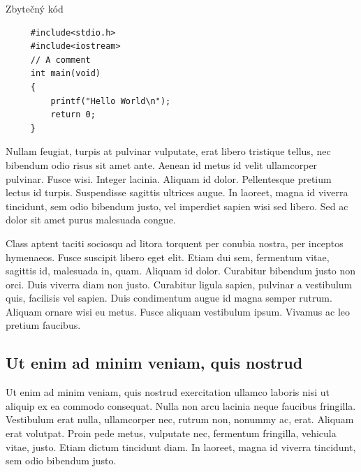  \begin{listing}
 \caption{Zbytečný kód}\label{list:8-6}
 \begin{verbatim}
     #include<stdio.h>
     #include<iostream>
     // A comment
     int main(void)
     {
         printf("Hello World\n");
         return 0;
     }
 \end{verbatim}
 \end{listing}

Nullam feugiat, turpis at pulvinar vulputate, erat libero tristique tellus, nec bibendum odio risus sit amet ante. Aenean id metus id velit ullamcorper pulvinar. Fusce wisi. Integer lacinia. Aliquam id dolor. Pellentesque pretium lectus id turpis. Suspendisse sagittis ultrices augue. In laoreet, magna id viverra tincidunt, sem odio bibendum justo, vel imperdiet sapien wisi sed libero. Sed ac dolor sit amet purus malesuada congue. \cite{Crochemore2002}

Class aptent taciti sociosqu ad litora torquent per conubia nostra, per inceptos hymenaeos. Fusce suscipit libero eget elit. Etiam dui sem, fermentum vitae, sagittis id, malesuada in, quam. Aliquam id dolor. Curabitur bibendum justo non orci. Duis viverra diam non justo. Curabitur ligula sapien, pulvinar a vestibulum quis, facilisis vel sapien. Duis condimentum augue id magna semper rutrum. Aliquam ornare wisi eu metus. Fusce aliquam vestibulum ipsum. Vivamus ac leo pretium faucibus. \cite{Motwani2014}

\subsection{Ut enim ad minim veniam, quis nostrud}

Ut enim ad minim veniam, quis nostrud exercitation ullamco laboris nisi ut aliquip ex ea commodo consequat. Nulla non arcu lacinia neque faucibus fringilla. Vestibulum erat nulla, ullamcorper nec, rutrum non, nonummy ac, erat. Aliquam erat volutpat. Proin pede metus, vulputate nec, fermentum fringilla, vehicula vitae, justo. Etiam dictum tincidunt diam. In laoreet, magna id viverra tincidunt, sem odio bibendum justo. \cite{Sestakova2018} 

